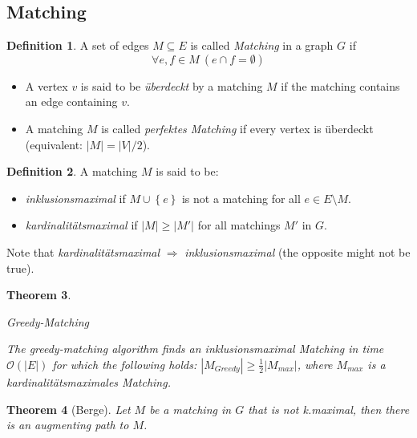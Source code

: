 \documentclass[12pt]{extarticle}
\theoremstyle{definition}
\newtheorem{definition}{Definition}[section]
\theoremstyle{remark}
\theoremstyle{plain}
\newtheorem{theorem}[definition]{Theorem}
\theoremstyle{plain}
\theoremstyle{plain}
\newcommand{\BO}{\mathcal{O}}
\begin{document}
\subsection{Matching}

\begin{definition}
    A set of edges $M \subseteq E$ is called \textit{Matching} in a graph $G$ if
    \[ \forall e,f \in M\ (e \cap f = \emptyset) \]

    \begin{itemize}
        \item A vertex $v$ is said to be \textit{überdeckt} by a matching $M$ if the matching contains an edge containing $v$.
        \item A matching $M$ is called \textit{perfektes Matching} if every vertex is überdeckt (equivalent: $|M| = |V| / 2$).
    \end{itemize}
\end{definition}

\begin{definition}
    A matching $M$ is said to be:
    \begin{itemize}
        \item \textit{inklusionsmaximal} if $M \cup \left\{ e \right\}$ is not a matching for all $e \in E \setminus M$.
        \item \textit{kardinalitätsmaximal} if $|M| \ge |M'|$ for all matchings $M'$ in $G$.
    \end{itemize}

    Note that \textit{kardinalitätsmaximal} $\Rightarrow$ \textit{inklusionsmaximal} (the opposite might not be true).
\end{definition}

\begin{theorem}
    \begin{algorithm}
        \caption{Greedy-Matching}
    \end{algorithm}

    The greedy-matching algorithm finds an inklusionsmaximal Matching in time $\BO(|E|)$
    for which the following holds: $|M_{Greedy}| \ge \frac{1}{2} |M_{max}|$, where $M_{max}$ is a kardinalitätsmaximales Matching.
\end{theorem}

\begin{theorem}[Berge]
    Let $M$ be a matching in $G$ that is not k.maximal, then there is an augmenting path to $M$.
\end{theorem}
\end{document}
